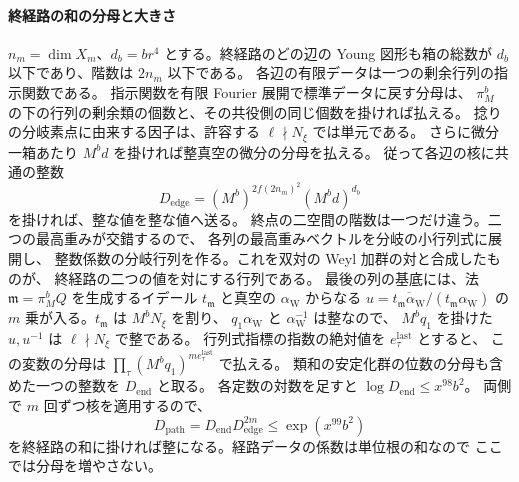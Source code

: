 \paragraph{終経路の和の分母と大きさ}
\(n_m=\dim X_m\)、\(d_b=b r^4\) とする。終経路のどの辺の
Young 図形も箱の総数が \(d_b\) 以下であり、階数は \(2n_m\) 以下である。
各辺の有限データは一つの剰余行列の指示関数である。
指示関数を有限 Fourier 展開で標準データに戻す分母は、
\(\pi_M^b\) の下の行列の剰余類の個数と、その共役側の同じ個数を掛ければ払える。
捻りの分岐素点に由来する因子は、許容する \(\ell\nmid N_\xi\) では単元である。
さらに微分一箱あたり \(M^b d\) を掛ければ整真空の微分の分母を払える。
従って各辺の核に共通の整数
\[
 D_\mathrm{edge}=(M^b)^{2f(2n_m)^2}(M^b d)^{d_b}
\]
を掛ければ、整な値を整な値へ送る。
終点の二空間の階数は一つだけ違う。二つの最高重みが交錯するので、
各列の最高重みベクトルを分岐の小行列式に展開し、
整数係数の分岐行列を作る。これを双対の Weyl 加群の対と合成したものが、
終経路の二つの値を対にする行列である。
最後の列の基底には、法 \(\mathfrak m=\pi_M^bQ\) を生成するイデール
\(t_{\mathfrak m}\) と真空の \(\alpha_\mathrm{W}\) からなる
\(u=\overline{t_{\mathfrak m}\alpha_\mathrm{W}}/(t_{\mathfrak m}\alpha_\mathrm{W})\)
の \(m\) 乗が入る。\(t_{\mathfrak m}\) は \(M^b N_\xi\) を割り、
\(q_1\alpha_\mathrm{W}\) と \(\alpha_\mathrm{W}^{-1}\) は整なので、
\(M^bq_1\) を掛けた \(u,u^{-1}\) は \(\ell\nmid N_\xi\) で整である。
行列式指標の指数の絶対値を \(e_\tau^\mathrm{last}\) とすると、
この変数の分母は \(\prod_\tau(M^b q_1)^{m e_\tau^\mathrm{last}}\) で払える。
類和の安定化群の位数の分母も含めた一つの整数を \(D_\mathrm{end}\) と取る。
各定数の対数を足すと \(\log D_\mathrm{end}\le x^{98}b^2\)。
両側で \(m\) 回ずつ核を適用するので、
\[
 D_\mathrm{path}=D_\mathrm{end}D_\mathrm{edge}^{2m}
       \le \exp(x^{99}b^2)
\]
を終経路の和に掛ければ整になる。経路データの係数は単位根の和なので
ここでは分母を増やさない。

